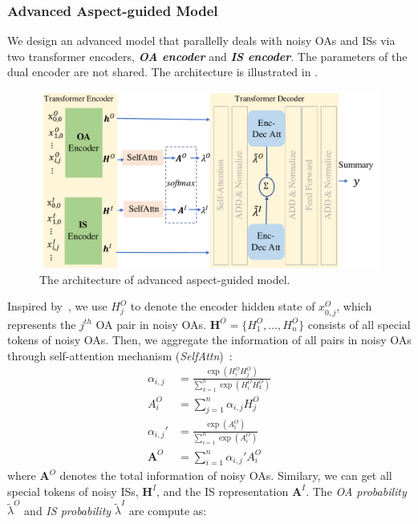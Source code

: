 \subsubsection{Advanced Aspect-guided Model}
We design an advanced model that parallelly deals with noisy OAs and ISs
via two transformer encoders, \textbf{\em OA encoder} and \textbf{\em IS encoder}. 
The parameters of the dual encoder are not shared.
The architecture is illustrated in .

\begin{figure}[th]
	\centering
	\includegraphics[width=1\linewidth]{./AMD.pdf}
	\caption{The architecture of advanced aspect-guided model. 
}
	\label{fig:amd}
\end{figure}

Inspired by~\citet{DialogMV2020},
we use $H^O_{j}$ to denote the encoder hidden state of $x^O_{0,j}$,
which represents the $j^{th}$ OA pair in noisy OAs.
$\textbf{H}^O=\{H^O_{1},...,H^O_n\}$ consists of all special tokens of noisy OAs.
Then, we aggregate the information of all pairs in noisy OAs through self-attention mechanism (\textit{SelfAttn})~\cite{Transformer17}:
\begin{align}
	\alpha_{i,j} &= \frac{\exp(H^O_i H^O_j)}{\sum_{k=1}^{n}\exp(H^O_i H^O_k)}\\
    A^O_{i} &= \sum\nolimits_{j=1}^{n}\alpha_{i,j}  H^O_j \\
    \alpha_{i,j}' &= \frac{\exp(A_i^O)}{\sum_{i=1}^{n}\exp(A_i^O)} \\
    \textbf{A}^O&= \sum\nolimits_{i=1}^{n} \alpha_{i,j}' A^O_i
\end{align}
where $\textbf{A}^O$ denotes the total information of noisy OAs.
Similary, we can get all special tokens of noisy ISs, $\textbf{H}^I$, and the IS representation $\textbf{A}^I$.
The {\em OA probability} $	\widetilde{\lambda}^O$
and 
{\em IS probability} $	\widetilde{\lambda}^I$ are compute as:


